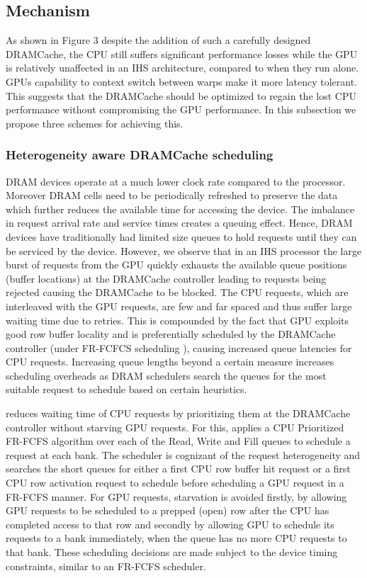\subsection{\cachename Mechanism} \label{mechanism}

As shown in Figure 3 despite the addition of such a carefully designed DRAMCache, the CPU still suffers significant performance losses while the GPU is relatively unaffected in an IHS architecture, compared to when they run alone. GPUs capability to context switch between warps make it more latency tolerant. This suggests that the DRAMCache should be optimized to regain the lost CPU performance without compromising the GPU performance. In this subsection we propose three schemes for achieving this.

\subsubsection{Heterogeneity aware DRAMCache scheduling} \label{mechanism-pris}
DRAM devices operate at a much lower clock rate compared to the processor. Moreover DRAM cells need to be periodically refreshed to preserve the data which further reduces the available time for accessing the device. The imbalance in request arrival rate and service times creates a queuing effect. Hence, DRAM devices have traditionally had limited size queues to hold requests until they can be serviced by the device. However, we observe that in an IHS processor the large burst of requests from the GPU quickly exhausts the available queue positions (buffer locations) at the DRAMCache controller leading to requests being rejected causing the DRAMCache to be blocked. 
The CPU requests, which are interleaved with the GPU requests, are few and far spaced and thus suffer large waiting time due to retries. This is compounded by the fact that GPU exploits good row buffer locality and is preferentially scheduled by the DRAMCache controller (under FR-FCFCS scheduling \cite{sms}), causing increased queue latencies for CPU requests. Increasing queue lengths beyond a certain measure increases scheduling overheads as DRAM schedulers search the queues for the most suitable request to schedule based on certain heuristics.
\par \cachename reduces waiting time of CPU requests by prioritizing them at the DRAMCache controller without starving GPU requests. 
For this, \cachename applies a CPU Prioritized FR-FCFS algorithm over each of the Read, Write and Fill queues to schedule a request at each bank. 
The scheduler is cognizant of the request heterogeneity and searches the short queues for either a first CPU row buffer hit request or a first CPU row activation request to schedule before scheduling a GPU request in a FR-FCFS manner. For GPU requests, starvation is avoided firstly, by allowing GPU requests to be scheduled to a prepped (open) row after the CPU has completed access to that row and secondly by allowing GPU to schedule its requests to a bank immediately, when the queue has no more CPU requests to that bank. These scheduling decisions are made subject to the device timing constraints, similar to an FR-FCFS scheduler.
